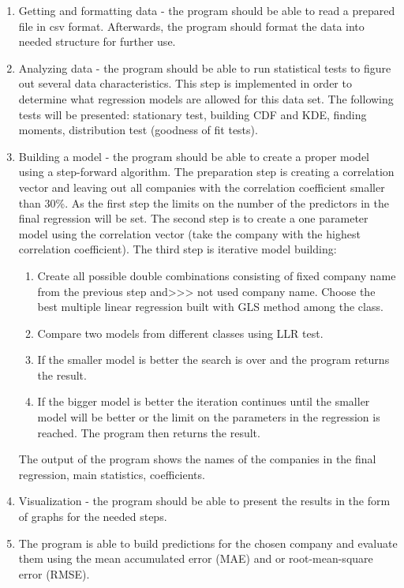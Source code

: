 \documentclass[
  twoside,
  11pt, a4paper,
  footinclude=true,
  headinclude=true,
  cleardoublepage=empty
]{scrreprt}
\begin{document}
    \begin{enumerate}
        \item Getting and formatting data - the program should be able to read a prepared file in csv format. Afterwards, the program should format the data into needed structure for further use.
        \item Analyzing data - the program should be able to run statistical tests to figure out several data characteristics. This step is implemented in order to determine what regression models are allowed for this data set. The following tests will be presented: stationary test, building CDF and KDE, finding moments, distribution test (goodness of fit tests).
        \item Building a model - the program should be able to create a proper model using a step-forward algorithm. The preparation step is creating a correlation vector and leaving out all companies with the correlation coefficient smaller than 30\%. As the first step the limits on the number of the predictors in the final regression will be set. The second step is to create a one parameter model using the correlation vector (take the company with the highest correlation coefficient). The third step is iterative model building: 
        \begin{enumerate}
            \item Create all possible double combinations consisting of fixed company name from the previous step and>>> not used company name. Choose the best multiple linear regression built with GLS method among the class. 
            \item Compare two models from different classes using LLR test.
            \item If the smaller model is better the search is over and the program returns the result.
            \item If the bigger model is better the iteration continues until the smaller model will be better or the limit on the parameters in the regression is reached. The program then returns the result. 
        \end{enumerate}
    The output of the program shows the names of the companies in the final regression, main statistics, coefficients.
        \item Visualization - the program should be able to present the results in the form of graphs for the needed steps.
        \item The program is able to build predictions for the chosen company and evaluate them using the mean accumulated error (MAE) and or root-mean-square error (RMSE).
    \end{enumerate}
\end{document}
